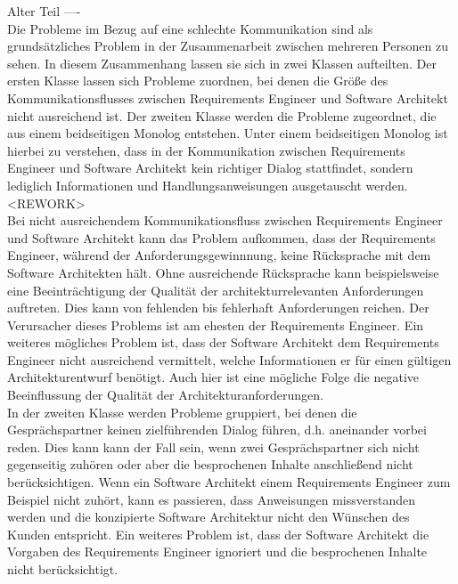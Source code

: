 Alter Teil ----\\
Die Probleme im Bezug auf eine schlechte Kommunikation sind als grundsätzliches Problem in der Zusammenarbeit zwischen mehreren Personen zu sehen. In diesem Zusammenhang lassen sie sich in zwei Klassen aufteilten. Der ersten Klasse lassen sich Probleme zuordnen, bei denen die Größe des Kommunikationsflusses zwischen Requirements Engineer und Software Architekt nicht ausreichend ist. Der zweiten Klasse werden die Probleme zugeordnet, die aus einem beidseitigen Monolog entstehen. Unter einem beidseitigen Monolog ist hierbei zu verstehen, dass in der Kommunikation zwischen Requirements Engineer und Software Architekt kein richtiger Dialog stattfindet, sondern lediglich Informationen und Handlungsanweisungen ausgetauscht werden. <REWORK>\\

Bei nicht ausreichendem Kommunikationsfluss zwischen Requirements Engineer und Software Architekt kann das Problem aufkommen, dass der Requirements Engineer, während der Anforderungsgewinnnung, keine Rücksprache mit dem Software Architekten hält. Ohne ausreichende Rücksprache kann beispielsweise eine Beeinträchtigung der Qualität der architekturrelevanten Anforderungen auftreten. Dies kann von fehlenden bis fehlerhaft Anforderungen reichen. Der Verursacher dieses Problems ist am ehesten der Requirements Engineer. Ein weiteres mögliches Problem ist, dass der Software Architekt dem Requirements Engineer nicht ausreichend vermittelt, welche Informationen er für einen gültigen Architekturentwurf benötigt. Auch hier ist eine mögliche Folge die negative Beeinflussung der Qualität der Architekturanforderungen.\\

In der zweiten Klasse werden Probleme gruppiert, bei denen die Gesprächspartner keinen zielführenden Dialog führen, d.h. aneinander vorbei reden. Dies kann kann der Fall sein, wenn zwei Gesprächspartner sich nicht gegenseitig zuhören oder aber die besprochenen Inhalte anschließend nicht berücksichtigen. Wenn ein Software Architekt einem Requirements Engineer zum Beispiel nicht zuhört, kann es passieren, dass Anweisungen missverstanden werden und die konzipierte Software Architektur nicht den Wünschen des Kunden entspricht. Ein weiteres Problem ist, dass der Software Architekt die Vorgaben des Requirements Engineer ignoriert und die besprochenen Inhalte nicht berücksichtigt. \\

